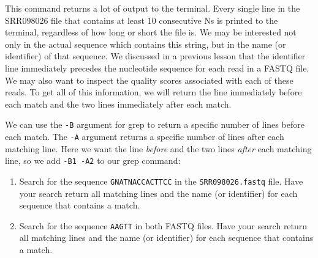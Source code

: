 \documentclass[
  letterpaper,
  DIV=11,
  numbers=noendperiod]{scrreprt}
\newenvironment{Shaded}{\begin{snugshade}}{\end{snugshade}}
\newcommand{\AttributeTok}[1]{\textcolor[rgb]{0.40,0.45,0.13}{#1}}
\newcommand{\ExtensionTok}[1]{\textcolor[rgb]{0.00,0.23,0.31}{#1}}
\newcommand{\NormalTok}[1]{\textcolor[rgb]{0.00,0.23,0.31}{#1}}
\providecommand{\tightlist}{%
  \setlength{\itemsep}{0pt}\setlength{\parskip}{0pt}}\usepackage{longtable,booktabs,array}
\begin{document}
This command returns a lot of output to the terminal. Every single line
in the SRR098026 file that contains at least 10 consecutive Ns is
printed to the terminal, regardless of how long or short the file is. We
may be interested not only in the actual sequence which contains this
string, but in the name (or identifier) of that sequence. We discussed
in a previous lesson that the identifier line immediately precedes the
nucleotide sequence for each read in a FASTQ file. We may also want to
inspect the quality scores associated with each of these reads. To get
all of this information, we will return the line immediately before each
match and the two lines immediately after each match.

We can use the \texttt{-B} argument for grep to return a specific number
of lines before each match. The \texttt{-A} argument returns a specific
number of lines after each matching line. Here we want the line
\emph{before} and the two lines \emph{after} each matching line, so we
add \texttt{-B1\ -A2} to our grep command:

\begin{Shaded}
\end{Shaded}

\begin{tcolorbox}[enhanced jigsaw, opacitybacktitle=0.6, colback=white, coltitle=black, opacityback=0, rightrule=.15mm, toptitle=1mm, toprule=.15mm, bottomtitle=1mm, colframe=quarto-callout-caution-color-frame, arc=.35mm, titlerule=0mm, colbacktitle=quarto-callout-caution-color!10!white, leftrule=.75mm, title={Exercise}, breakable, bottomrule=.15mm, left=2mm]

\begin{enumerate}
\def\labelenumi{\arabic{enumi}.}
\tightlist
\item
  Search for the sequence \texttt{GNATNACCACTTCC} in the
  \texttt{SRR098026.fastq} file. Have your search return all matching
  lines and the name (or identifier) for each sequence that contains a
  match.
\item
  Search for the sequence \texttt{AAGTT} in both FASTQ files. Have your
  search return all matching lines and the name (or identifier) for each
  sequence that contains a match.
\end{enumerate}

\end{tcolorbox}
\end{document}
